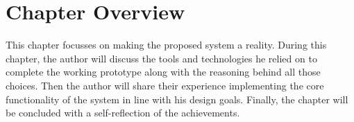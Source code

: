 \section{Chapter Overview}

This chapter focusses on making the proposed system a reality. During this chapter, the author will discuss the tools and technologies he relied on to complete the working prototype along with the reasoning behind all those choices. Then the author will share their experience implementing the core functionality of the system in line with his design goals. Finally, the chapter will be concluded with a self-reflection of the achievements.